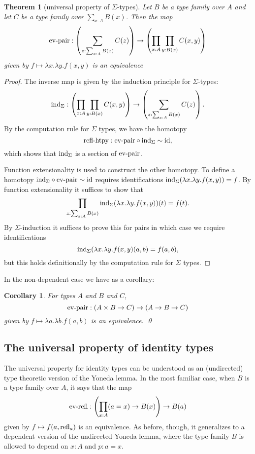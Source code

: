 \documentclass{amsart}
\theoremstyle{theorem}
\newtheorem*{thm}{Theorem}
\newtheorem*{cor}{Corollary}
\theoremstyle{definition}
\theoremstyle{remark}
\newcommand{\0}{\mathbbe{0}}
\newcommand{\1}{\mathbbe{1}}
\newcommand{\2}{\mathbbe{2}}
\newcommand{\3}{\mathbbe{3}}
\newcommand{\4}{\mathbbe{4}}
\newcommand{\term}[1]{{\textup{#1}}}
\newcommand{\id}{\term{id}}
\newcommand{\ind}{\term{ind}}
\newcommand{\refl}{\term{refl}}
\begin{document}
\begin{thm}[universal property of \texorpdfstring{$\Sigma$}{Sigma}-types]
Let $B$ be a type family over $A$ and let $C$ be a type family over $\sum_{x:A}B(x)$. Then the map
\[ \term{ev-pair} : \left( \sum_{z: \sum_{x:A}B(x)} C(z) \right) \to \left( \prod_{x:A}\prod_{y:B(x)} C(x,y) \right)\]
given by $f \mapsto \lambda x.\lambda y. f(x,y)$ is an equivalence
\end{thm}
\begin{proof}
The inverse map is given by the induction principle for $\Sigma$-types:
\[ \ind_\Sigma : \left( \prod_{x:A}\prod_{y:B(x)} C(x,y) \right) \to \left( \sum_{z: \sum_{x:A}B(x)} C(z) \right) .\]
By the computation rule for $\Sigma$ types, we have the homotopy
\[ \term{refl-htpy} : \term{ev-pair} \circ\ind_\Sigma \sim \id,\]
which shows that $\ind_\Sigma$ is a section of $\term{ev-pair}$.

Function extensionality is used to construct the other homotopy. To define a homotopy $\ind_\Sigma \circ \term{ev-pair} \sim \id$ requires identifications $\ind_\Sigma(\lambda x. \lambda y. f(x,y)) = f$. By function extensionality it suffices to show that
\[ \prod_{z: \sum_{x:A}B(x)} \ind_\Sigma(\lambda x. \lambda y. f(x,y))(t) = f(t).\] By $\Sigma$-induction it suffices to prove this for pairs in which case we require identifications
\[ \ind_\Sigma(\lambda x. \lambda y. f(x,y)(a,b) = f(a,b),\]
but this holds definitionally by the computation rule for $\Sigma$ types.
\end{proof}

In the non-dependent case we have as a corollary:

\begin{cor} For types $A$ and $B$ and $C$,
\[ \term{ev-pair} : (A \times B \to C) \to (A \to B \to C)\]
given by $f \mapsto \lambda a. \lambda b. f(a,b)$ is an equivalence. \qed
\end{cor}

\subsection*{The universal property of identity types}

The universal property for identity types can be understood as an (undirected) type theoretic version of the Yoneda lemma. In the most familiar case, when $B$ is a type family over $A$, it says that the map
\[ \term{ev-refl} : \left( \prod_{x:A}(a=x) \to B(x) \right) \to B(a)\]
given by $f \mapsto f(a,\refl_a)$ is an equivalence. As before, though, it generalizes to a dependent version of the undirected Yoneda lemma, where the type family $B$ is allowed to depend on $x :A$ and $p: a =x$.
\end{document}
